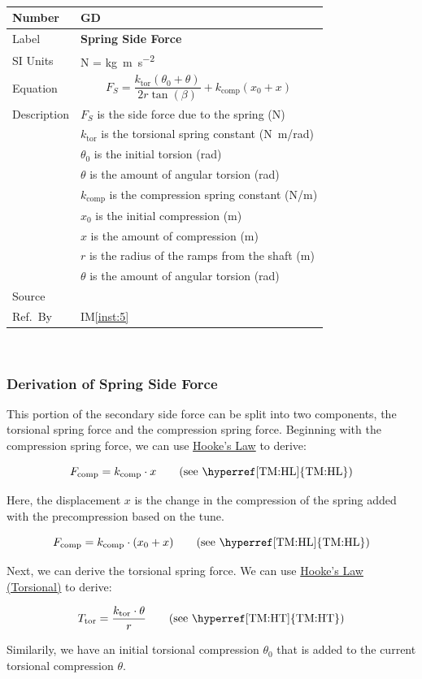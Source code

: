 \documentclass[12pt]{article}
\newcommand{\colAwidth}{0.13\textwidth}
\newcommand{\colBwidth}{0.82\textwidth}
\newcounter{defnum} %
\newcommand{\iref}[1]{IM\ref{#1}}
\newcommand{\defgeneral}[6] {
~\newline
\noindent
\begin{minipage}{\textwidth}
\renewcommand*{\arraystretch}{1.5}
\begin{tabular}{| p{\colAwidth} | p{\colBwidth}|}
  \hline
  \rowcolor[gray]{0.9}
  Number& GD\refstepcounter{defnum}\thedefnum \label{GD_\thedefnum}\\
  \hline
  Label& \bf #1 \\
  \hline
  SI Units& #2\\
  \hline
  Equation& #3\\
  \hline
  Description& #4 \\
  \hline
  Source& #5 \\
  \hline
  Ref.\ By & #6\\
  \hline
\end{tabular}
\end{minipage}\\
}
\begin{document}
\defgeneral
{Spring Side Force} %
{N = \si{\kilogram \metre\per\square\second}} %
{\[F_S = \frac{k_{\text{tor}}(\theta_0 + \theta)}{2r\tan(\beta)} + k_\text{comp}(x_0 + x)\]} %
{$F_S$ is the side force due to the spring (N) \\
& $k_{\text{tor}}$ is the torsional spring constant (\si[per-mode=symbol] {\newton\metre\per\radian}) \\
& $\theta_0$ is the initial torsion (rad) \\
& $\theta$ is the amount of angular torsion (rad) \\
& $k_{\text{comp}}$ is the compression spring constant (\si[per-mode=symbol] {\newton\per\metre}) \\
& $x_0$ is the initial compression (m) \\
& $x$ is the amount of compression (m) \\
& $r$ is the radius of the ramps from the shaft (m) \\
& $\theta$ is the amount of angular torsion (rad)} %
{} %
{\iref{inst:5}} %

\subsubsection*{Derivation of Spring Side Force}

This portion of the secondary side force can be split into two components, the torsional spring force and the compression spring force. 
Beginning with the compression spring force, we can use \hyperref[TM:HL]{Hooke's Law} to derive:

\[ F_{\text{comp}} = k_{\text{comp}} \cdot x \tag*{\text{(see \hyperref[TM:HL]{TM:HL})}}\]

Here, the displacement $x$ is the change in the compression of the spring added with the precompression based on the tune.

\[ F_{\text{comp}} = k_{\text{comp}} \cdot (x_0 + x) \tag*{\text{(see \hyperref[TM:HL]{TM:HL})}}\]

Next, we can derive the torsional spring force. We can use \hyperref[TM:HT]{Hooke's Law (Torsional)} to derive:

\[ T_{\text{tor}} = \frac{k_{\text{tor}} \cdot \theta}{r} \tag*{\text{(see \hyperref[TM:HT]{TM:HT})}}\]

Similarily, we have an initial torsional compression $\theta_0$ that is added to the current torsional compression $\theta$.
\end{document}
